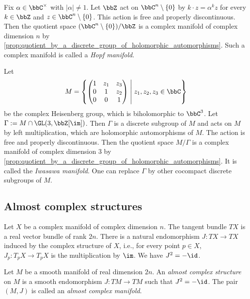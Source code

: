 \begin{example}\label{eg:hopf_manifolds_as_complex_manifolds_by_quotient_of_Cn}
	Fix \(\alpha \in \bbC^\times\) with \(|\alpha| \neq 1\).
	Let \(\bbZ\) act on \(\bbC^n\setminus \{0\}\) by \(k \cdot z = \alpha^k z\) for every \(k\in \bbZ\) and \(z\in \bbC^n\setminus \{0\}\).
	This action is free and properly discontinuous.
	Then the quotient space \((\bbC^n\setminus \{0\})/\bbZ\) is a complex manifold of complex dimension \(n\) by \cref{prop:quotient_by_a_discrete_group_of_holomorphic_automorphisms}.
	Such a complex manifold is called a \emph{Hopf manifold}.
\end{example}

\begin{example}\label{eg:Iwasawa_manifold_as_complex_manifold_by_quotient_of_complex_Heisenberg_group}
	Let
	\[ M = \left\{ \begin{pmatrix}
			1 & z_1 & z_3 \\
			0 & 1   & z_2 \\
			0 & 0   & 1
		\end{pmatrix} \;\middle|\; z_1, z_2, z_3 \in \bbC \right\} \]
	be the complex Heisenberg group, which is biholomorphic to \(\bbC^3\).
	Let \(\Gamma := M \cap \GL(3,\bbZ[\im])\).
	Then \(\Gamma\) is a discrete subgroup of \(M\) and acts on \(M\) by left multiplication, which are holomorphic automorphisms of \(M\).
	The action is free and properly discontinuous.
	Then the quotient space \(M/\Gamma\) is a complex manifold of complex dimension \(3\) by \cref{prop:quotient_by_a_discrete_group_of_holomorphic_automorphisms}.
	It is called the \emph{Iwasawa manifold}.
	One can replace \(\Gamma\) by other cocompact discrete subgroups of \(M\).
\end{example}

\subsection{Almost complex structures}

Let \(X\) be a complex manifold of complex dimension \(n\).
The tangent bundle \(TX\) is a real vector bundle of rank \(2n\).
There is a natural endomorphism \(J: TX\to TX\) induced by the complex structure of \(X\), i.e., for every point \(p\in X\), \(J_p: T_pX\to T_pX\) is the multiplication by \(\im\).
We have \(J^2 = -\id\).

\begin{definition}\label{def:almost_complex_structure}
	Let \(M\) be a smooth manifold of real dimension \(2n\).
	An \emph{almost complex structure} on \(M\) is a smooth endomorphism \(J: TM\to TM\) such that \(J^2 = -\id\).
	The pair \((M,J)\) is called an \emph{almost complex manifold}.
\end{definition}


